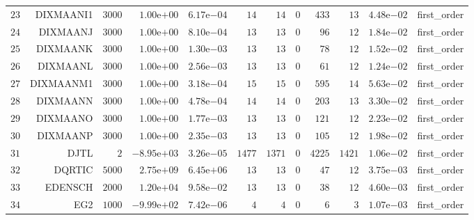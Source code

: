 \begin{longtable}{rrrrrrrrrrrr}
  \(    23\) & DIXMAANI1 & \(  3000\) & \( 1.00\)e\(+00\) & \( 6.17\)e\(-04\) & \(    14\) & \(    14\) & \(     0\) & \(   433\) & \(    13\) & \( 4.48\)e\(-02\) & first\_order \\
  \(    24\) & DIXMAANJ & \(  3000\) & \( 1.00\)e\(+00\) & \( 8.10\)e\(-04\) & \(    13\) & \(    13\) & \(     0\) & \(    96\) & \(    12\) & \( 1.84\)e\(-02\) & first\_order \\
  \(    25\) & DIXMAANK & \(  3000\) & \( 1.00\)e\(+00\) & \( 1.30\)e\(-03\) & \(    13\) & \(    13\) & \(     0\) & \(    78\) & \(    12\) & \( 1.52\)e\(-02\) & first\_order \\
  \(    26\) & DIXMAANL & \(  3000\) & \( 1.00\)e\(+00\) & \( 2.56\)e\(-03\) & \(    13\) & \(    13\) & \(     0\) & \(    61\) & \(    12\) & \( 1.24\)e\(-02\) & first\_order \\
  \(    27\) & DIXMAANM1 & \(  3000\) & \( 1.00\)e\(+00\) & \( 3.18\)e\(-04\) & \(    15\) & \(    15\) & \(     0\) & \(   595\) & \(    14\) & \( 5.63\)e\(-02\) & first\_order \\
  \(    28\) & DIXMAANN & \(  3000\) & \( 1.00\)e\(+00\) & \( 4.78\)e\(-04\) & \(    14\) & \(    14\) & \(     0\) & \(   203\) & \(    13\) & \( 3.30\)e\(-02\) & first\_order \\
  \(    29\) & DIXMAANO & \(  3000\) & \( 1.00\)e\(+00\) & \( 1.77\)e\(-03\) & \(    13\) & \(    13\) & \(     0\) & \(   121\) & \(    12\) & \( 2.23\)e\(-02\) & first\_order \\
  \(    30\) & DIXMAANP & \(  3000\) & \( 1.00\)e\(+00\) & \( 2.35\)e\(-03\) & \(    13\) & \(    13\) & \(     0\) & \(   105\) & \(    12\) & \( 1.98\)e\(-02\) & first\_order \\
  \(    31\) & DJTL & \(     2\) & \(-8.95\)e\(+03\) & \( 3.26\)e\(-05\) & \(  1477\) & \(  1371\) & \(     0\) & \(  4225\) & \(  1421\) & \( 1.06\)e\(-02\) & first\_order \\
  \(    32\) & DQRTIC & \(  5000\) & \( 2.75\)e\(+09\) & \( 6.45\)e\(+06\) & \(    13\) & \(    13\) & \(     0\) & \(    47\) & \(    12\) & \( 3.75\)e\(-03\) & first\_order \\
  \(    33\) & EDENSCH & \(  2000\) & \( 1.20\)e\(+04\) & \( 9.58\)e\(-02\) & \(    13\) & \(    13\) & \(     0\) & \(    38\) & \(    12\) & \( 4.60\)e\(-03\) & first\_order \\
  \(    34\) & EG2 & \(  1000\) & \(-9.99\)e\(+02\) & \( 7.42\)e\(-06\) & \(     4\) & \(     4\) & \(     0\) & \(     6\) & \(     3\) & \( 1.07\)e\(-03\) & first\_order \\

\end{longtable}
